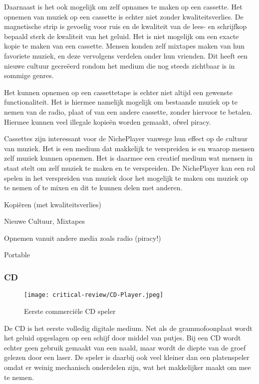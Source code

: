 Daarnaast is het ook mogelijk om zelf opnames te maken op een cassette. Het opnemen van muziek op een cassette is echter niet zonder kwaliteitsverlies. De magnetische strip is gevoelig voor ruis en de kwaliteit van de lees- en schrijfkop bepaald sterk de kwaliteit van het geluid. Het is niet mogelijk om een exacte kopie te maken van een cassette. Mensen konden zelf mixtapes maken van hun favoriete muziek, en deze vervolgens verdelen onder hun vrienden. Dit heeft een nieuwe cultuur gecreëerd rondom het medium die nog steeds zichtbaar is in sommige genres.

Het kunnen opnemen op een cassettetape is echter niet altijd een gewenste functionaliteit. Het is hiermee namelijk mogelijk om bestaande muziek op te nemen van de radio, plaat of van een andere cassette, zonder hiervoor te betalen. Hiermee kunnen veel illegale kopieën worden gemaakt, ofwel piracy. 

Cassettes zijn interessant voor de NichePlayer vanwege hun effect op de cultuur van muziek. Het is een medium dat makkelijk te verspreiden is en waarop mensen zelf muziek kunnen opnemen. Het is daarmee een creatief medium wat mensen in staat stelt om zelf muziek te maken en te verspreiden. De NichePlayer kan een rol spelen in het verspreiden van muziek door het mogelijk te maken om muziek op te nemen of te mixen en dit te kunnen delen met anderen.

\begin{todolist}
    \item Kopiëren (met kwaliteitsverlies)
    \item[\done] Nieuwe Cultuur, Mixtapes
    \item[\done] Opnemen vanuit andere media zoals radio (piracy!)
    \item[\done] Portable
\end{todolist}

\subsubsection*{CD}
\begin{wrapfigure}{r}{0.25\textwidth}
    \centering
    \texttt{[image: critical-review/CD-Player.jpeg]}
    \caption{Eerste commerciële CD speler}
    \label{fig:critical-review:cp-player}
\end{wrapfigure}
De CD is het eerste volledig digitale medium. Net als de grammofoonplaat wordt het geluid opgeslagen op een schijf door middel van putjes. Bij een CD wordt echter geen gebruik gemaakt van een naald, maar wordt de diepte van de groef gelezen door een laser. De speler is daarbij ook veel kleiner dan een platenspeler omdat er weinig mechanisch onderdelen zijn, wat het makkelijker maakt om mee te nemen.

